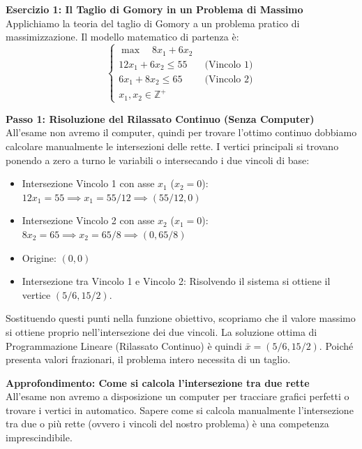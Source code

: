 \documentclass[12pt, a4paper]{article}
\begin{document}
	\vspace{0.6cm}
	\textbf{Esercizio 1: Il Taglio di Gomory in un Problema di Massimo}\\
	Applichiamo la teoria del taglio di Gomory a un problema pratico di massimizzazione. Il modello matematico di partenza è:
	\[
	\begin{cases}
		\max \quad 8x_1 + 6x_2 \\[6pt]
		12x_1 + 6x_2 \leq 55 \quad &\text{(Vincolo 1)} \\
		6x_1 + 8x_2 \leq 65 \quad &\text{(Vincolo 2)} \\[6pt]
		x_1, x_2 \in \mathbb{Z}^+
	\end{cases}
	\]
	
	\textbf{Passo 1: Risoluzione del Rilassato Continuo (Senza Computer)}\\
	All'esame non avremo il computer, quindi per trovare l'ottimo continuo dobbiamo calcolare manualmente le intersezioni delle rette. I vertici principali si trovano ponendo a zero a turno le variabili o intersecando i due vincoli di base:
	\begin{itemize}[label=\textcolor{titlecolor}{\Large\textbullet}, itemsep=2pt, leftmargin=1.5cm]
		\item Intersezione Vincolo 1 con asse $x_1$ ($x_2 = 0$): $12x_1 = 55 \implies x_1 = 55/12 \implies (55/12, 0)$
		\item Intersezione Vincolo 2 con asse $x_2$ ($x_1 = 0$): $8x_2 = 65 \implies x_2 = 65/8 \implies (0, 65/8)$
		\item Origine: $(0,0)$
		\item Intersezione tra Vincolo 1 e Vincolo 2: Risolvendo il sistema si ottiene il vertice $(5/6, 15/2)$.
	\end{itemize}
	Sostituendo questi punti nella funzione obiettivo, scopriamo che il valore massimo si ottiene proprio nell'intersezione dei due vincoli. La soluzione ottima di Programmazione Lineare (Rilassato Continuo) è quindi $\bar{x} = (5/6, 15/2)$. Poiché presenta valori frazionari, il problema intero necessita di un taglio.
	
	\vspace{0.4cm}
	\textbf{Approfondimento: Come si calcola l'intersezione tra due rette}\\
	All'esame non avremo a disposizione un computer per tracciare grafici perfetti o trovare i vertici in automatico. Sapere come si calcola manualmente l'intersezione tra due o più rette (ovvero i vincoli del nostro problema) è una competenza imprescindibile. 
	
\end{document}
